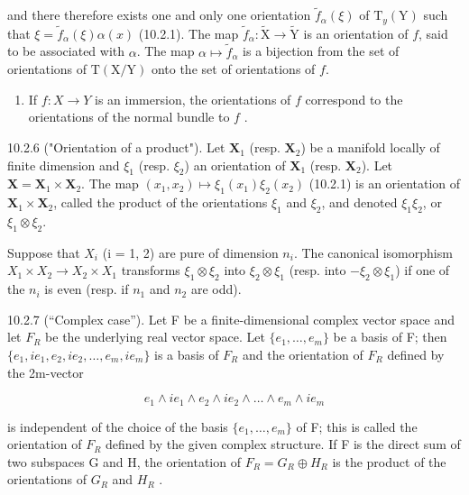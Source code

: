 and there therefore exists one and only one orientation \(\tilde{f}_{\alpha}(\xi)\) of \(\mathrm{T}_{y}(\mathrm{Y})\) such that \(\xi = \tilde{f}_{\alpha}(\xi)\alpha(x)\) (10.2.1). The map \(\tilde{f}_{\alpha}\colon \tilde{\mathrm{X}}\to \tilde{\mathrm{Y}}\) is an orientation of \(f\), said to be associated with \(\alpha\). The map \(\alpha \mapsto \tilde{f}_{\alpha}\) is a bijection from the set of orientations of \(\mathrm{T}(\mathrm{X}/\mathrm{Y})\) onto the set of orientations of \(f\).

\begin{enumerate}
\def\labelenumi{\alph{enumi})}
\setcounter{enumi}{3}
\tightlist
\item
  If \(f: X \to Y\) is an immersion, the orientations of \(f\) correspond to the orientations of the normal bundle to \(f\) .
\end{enumerate}

10.2.6 ("Orientation of a product"). Let \(\mathbf{X}_1\) (resp. \(\mathbf{X}_2\)) be a manifold locally of finite dimension and \(\xi_1\) (resp. \(\xi_2\)) an orientation of \(\mathbf{X}_1\) (resp. \(\mathbf{X}_2\)). Let \(\mathbf{X} = \mathbf{X}_1 \times \mathbf{X}_2\). The map \((x_1, x_2) \mapsto \xi_1(x_1)\xi_2(x_2)\) (10.2.1) is an orientation of \(\mathbf{X}_1 \times \mathbf{X}_2\), called the product of the orientations \(\xi_1\) and \(\xi_2\), and denoted \(\xi_1\xi_2\), or \(\xi_1 \otimes \xi_2\).

Suppose that \(X_{i}\) (i = 1, 2) are pure of dimension \(n_{i}\). The canonical isomorphism \(X_{1} \times X_{2} \to X_{2} \times X_{1}\) transforms \(\xi_{1} \otimes \xi_{2}\) into \(\xi_{2} \otimes \xi_{1}\) (resp. into \(-\xi_{2} \otimes \xi_{1}\)) if one of the \(n_{i}\) is even (resp. if \(n_{1}\) and \(n_{2}\) are odd).

10.2.7 (“Complex case”). Let F be a finite-dimensional complex vector space and let \(F_{R}\) be the underlying real vector space. Let \(\{e_{1},\ldots,e_{m}\}\) be a basis of F; then \(\{e_{1},ie_{1},e_{2},ie_{2},\ldots,e_{m},ie_{m}\}\) is a basis of \(F_{R}\) and the orientation of \(F_{R}\) defined by the 2m-vector

\[
e _ {1} \wedge i e _ {1} \wedge e _ {2} \wedge i e _ {2} \wedge \dots \wedge e _ {m} \wedge i e _ {m}
\]

is independent of the choice of the basis \(\{e_{1},\ldots,e_{m}\}\) of F; this is called the orientation of \(F_{R}\) defined by the given complex structure. If F is the direct sum of two subspaces G and H, the orientation of \(F_{R}=G_{R}\oplus H_{R}\) is the product of the orientations of \(G_{R}\) and \(H_{R}\) .

